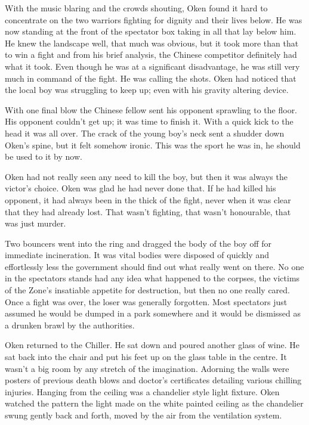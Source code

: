 With the music blaring and the crowds shouting, Oken found it hard to concentrate on the two warriors fighting for dignity and their lives below.  He was now standing at the front of the spectator box taking in all that lay below him.  He knew the landscape well, that much was obvious, but it took more than that to win a fight and from his brief analysis, the Chinese competitor definitely had what it took.  Even though he was at a significant disadvantage, he was still very much in command of the fight.  He was calling the shots.  Oken had noticed that the local boy was struggling to keep up; even with his gravity altering device.

With one final blow the Chinese fellow sent his opponent sprawling to the floor.  His opponent couldn't get up; it was time to finish it.  With a quick kick to the head it was all over.  The crack of the young boy's neck sent a shudder down Oken's spine, but it felt somehow ironic.  This was the sport he was in, he should be used to it by now.  

Oken had not really seen any need to kill the boy, but then it was always the victor's choice.  Oken was glad he had never done that.  If he had killed his opponent, it had always been in the thick of the fight, never when it was clear that they had already lost.  That wasn't fighting, that wasn't honourable, that was just murder.

Two bouncers went into the ring and dragged the body of the boy off for immediate incineration.  It was vital bodies were disposed of quickly and effortlessly less the government should find out what really went on there.  No one in the spectators stands had any idea what happened to the corpses, the victims of the Zone's insatiable appetite for destruction, but then no one really cared.  Once a fight was over, the loser was generally forgotten. Most spectators just assumed he would be dumped in a park somewhere and it would be dismissed as a drunken brawl by the authorities.

Oken returned to the Chiller.  He sat down and poured another glass of wine.  He sat back into the chair and put his feet up on the glass table in the centre.  It wasn't a big room by any stretch of the imagination.  Adorning the walls were posters of previous death blows and doctor's certificates detailing various chilling injuries.  Hanging from the ceiling was a chandelier style light fixture.  Oken watched the pattern the light made on the white painted ceiling as the chandelier swung gently back and forth, moved by the air from the ventilation system.


